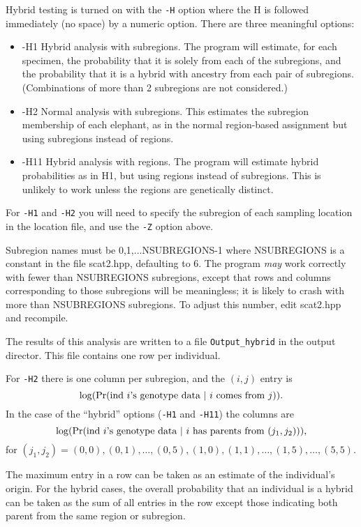 \documentclass[10pt,titlepage,times,letterpaper]{article}
\def \Pr{{\rm Pr}}
\begin{document}
Hybrid testing is turned on with the {\tt -H} option where the H is
followed immediately (no space) by a numeric option.  There are three
meaningful options:

\begin{itemize}
\item -H1 Hybrid analysis with subregions.  The program will estimate,
for each specimen, the probability that it is solely from each of the
subregions, and the probability that it is a hybrid with ancestry from
each pair of subregions.  (Combinations of more than 2 subregions are
not considered.)
\item -H2  Normal analysis with subregions.   This estimates the
subregion membership of each elephant, as in the normal region-based
assignment but using subregions instead of regions.  
\item -H11 Hybrid analysis with regions.  The program will estimate 
hybrid probabilities as in H1, but using regions instead of subregions.  
This is unlikely to work unless the regions are genetically distinct.
\end{itemize}

For {\tt -H1} and {\tt -H2} you will need to specify the subregion of
each sampling location in the location file, and use the {\tt -Z} option above. 

Subregion names must be 0,1,...NSUBREGIONS-1 where NSUBREGIONS is a
constant in the file scat2.hpp, defaulting to 6.  The program {\it may}
work correctly with fewer than NSUBREGIONS subregions, except that 
rows and columns corresponding to those subregions will be meaningless; it
is likely to crash with more than NSUBREGIONS subregions.  To adjust this
number, edit scat2.hpp and recompile.

The results of this analysis are written to a file {\tt Output\_hybrid} in
the output director.  This file contains one row per individual.

For {\tt -H2} there is one column per subregion, and the $(i,j)$ entry
is $$\log(\Pr(\text{ind $i$'s genotype data $\mid$ $i$ comes from $j$})).$$
In the case of the ``hybrid'' options ({\tt -H1} and {\tt -H11}) the columns are
$$\log(\Pr(\text{ind $i$'s genotype data $\mid$ $i$ has parents from $(j_1,j_2)$})),$$
for $(j_1,j_2) = (0,0), (0,1),\dots,(0,5),(1,0),(1,1),\dots,(1,5),\dots, (5,5)$.

The maximum entry in a row can be taken as an estimate of the individual's
origin.  For the hybrid cases, the overall probability that an individual is
a hybrid can be taken as the sum of all entries in the row except those indicating
both parent from the same region or subregion.
\end{document}
